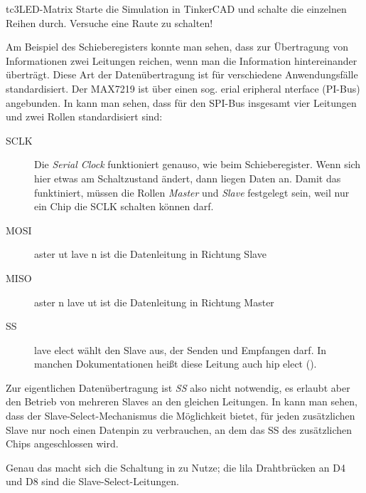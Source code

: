 \begin{multicols}{2}
\begin{excercise}{tc3}{LED-Matrix}
Starte die Simulation in TinkerCAD und schalte die einzelnen Reihen durch. Versuche eine Raute zu schalten!
\end{excercise}

\vfill\null\pagebreak
{}

Am Beispiel des Schieberegisters konnte man sehen, dass zur Übertragung von Informationen zwei
Leitungen reichen, wenn man die Information hintereinander überträgt. Diese Art der Datenübertragung
ist für verschiedene Anwendungsfälle standardisiert. Der MAX7219 ist über einen sog. 
erial eripheral nterface  (PI-Bus) angebunden. 
In  kann man sehen, dass für den SPI-Bus insgesamt vier Leitungen und zwei Rollen 
standardisiert sind:
\begin{description}
  \item[SCLK] Die \emph{Serial Clock} funktioniert genauso, wie beim Schieberegister. Wenn sich hier etwas 
  am Schaltzustand ändert, dann liegen Daten an. Damit das funktiniert, müssen die Rollen \emph{Master} und 
  \emph{Slave} festgelegt sein, weil nur ein Chip die SCLK schalten können darf.
  \item[MOSI] aster ut lave n ist die Datenleitung in Richtung Slave
  \item[MISO] aster n lave ut ist die Datenleitung in Richtung Master
  \item[SS] lave elect wählt den Slave aus, der Senden und Empfangen darf. 
  In manchen Dokumentationen heißt diese Leitung auch hip elect ().
\end{description}

Zur eigentlichen Datenübertragung ist \emph{SS} also nicht notwendig, es erlaubt aber den Betrieb von mehreren Slaves
an den gleichen Leitungen. In  kann man sehen, dass der Slave-Select-Mechanismus die Möglichkeit bietet,
für jeden zusätzlichen Slave nur noch einen Datenpin zu verbrauchen, an dem das SS des zusätzlichen Chips angeschlossen
wird.

Genau das macht sich die Schaltung in  zu Nutze; die lila Drahtbrücken an D4 und D8 sind die Slave-Select-Leitungen.



\end{multicols}
